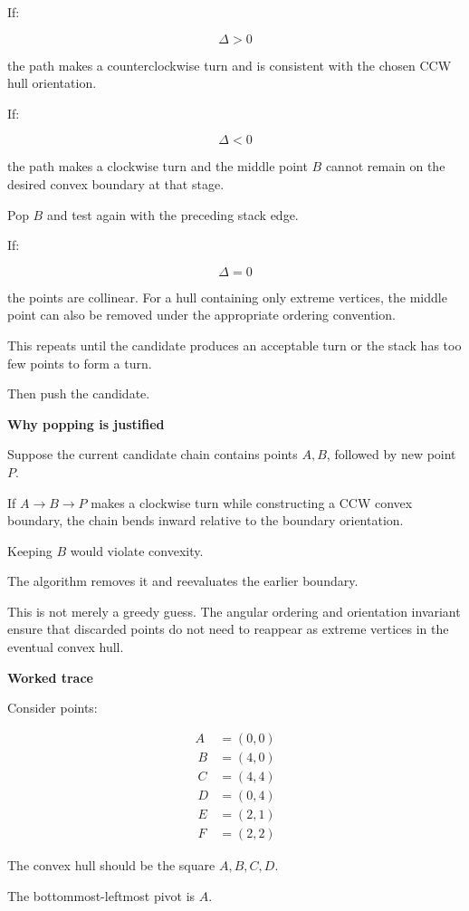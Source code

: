 If:

\[
\Delta>0
\]

the path makes a counterclockwise turn and is consistent with the chosen CCW hull orientation.

If:

\[
\Delta<0
\]

the path makes a clockwise turn and the middle point \(B\) cannot remain on the desired convex boundary at that stage.

Pop \(B\) and test again with the preceding stack edge.

If:

\[
\Delta=0
\]

the points are collinear. For a hull containing only extreme vertices, the middle point can also be removed under the appropriate ordering convention.

This repeats until the candidate produces an acceptable turn or the stack has too few points to form a turn.

Then push the candidate.

\textbf{Why popping is justified}

Suppose the current candidate chain contains points \(A,B\), followed by new point \(P\).

If \(A\rightarrow B\rightarrow P\) makes a clockwise turn while constructing a CCW convex boundary, the chain bends inward relative to the boundary orientation.

Keeping \(B\) would violate convexity.

The algorithm removes it and reevaluates the earlier boundary.

This is not merely a greedy guess. The angular ordering and orientation invariant ensure that discarded points do not need to reappear as extreme vertices in the eventual convex hull.

\textbf{Worked trace}

Consider points:

\[
\begin{aligned} A&=(0,0)\\\ B&=(4,0)\\\ C&=(4,4)\\\ D&=(0,4)\\\ E&=(2,1)\\\ F&=(2,2) \end{aligned}
\]

The convex hull should be the square \(A,B,C,D\).

The bottommost-leftmost pivot is \(A\).

